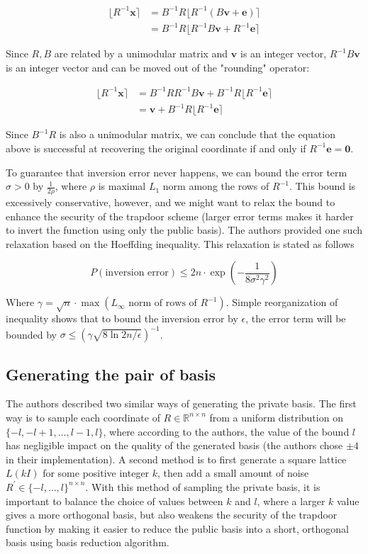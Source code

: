 \documentclass[letterpaper,12pt]{article}
\begin{document}
$$
\begin{aligned}
\lfloor R^{-1}\mathbf{x} \rceil &= B^{-1}R\lfloor R^{-1}(B\mathbf{v} + \mathbf{e})\rceil \\
&= B^{-1}R\lfloor R^{-1}B\mathbf{v} + R^{-1}\mathbf{e}\rceil
\end{aligned}
$$

Since $R, B$ are related by a unimodular matrix and $\mathbf{v}$ is an integer vector, $R^{-1}B\mathbf{v}$ is an integer vector and can be moved out of the "rounding" operator:

$$
\begin{aligned}
\lfloor R^{-1}\mathbf{x} \rceil &= B^{-1}RR^{-1}B\mathbf{v} + B^{-1}R\lfloor R^{-1}\mathbf{e}\rceil \\
&= \mathbf{v} + B^{-1}R\lfloor R^{-1}\mathbf{e} \rceil
\end{aligned}
$$

Since $B^{-1}R$ is also a unimodular matrix, we can conclude that the equation above is successful at recovering the original coordinate if and only if $R^{-1}\mathbf{e} = \mathbf{0}$.

To guarantee that inversion error never happens, we can bound the error term $\sigma > 0$ by $\frac{1}{2\rho}$, where $\rho$ is maximal $L_1$ norm among the rows of $R^{-1}$. This bound is excessively conservative, however, and we might want to relax the bound to enhance the security of the trapdoor scheme (larger error terms makes it harder to invert the function using only the public basis). The authors provided one such relaxation based on the Hoeffding inequality. This relaxation is stated as follows

$$
P(\text{inversion error}) \leq 2n \cdot \exp(-\frac{1}{8\sigma^2\gamma^2})
$$

Where $\gamma = \sqrt{n} \cdot \max(L_\infty \text{ norm of rows of } R^{-1})$. Simple reorganization of inequality shows that to bound the inversion error by $\epsilon$, the error term will be bounded by $\sigma \leq (\gamma\sqrt{8\ln{2n/\epsilon}})^{-1}$.

\subsection{Generating the pair of basis}
The authors described two similar ways of generating the private basis. The first way is to sample each coordinate of $R \in \mathbb{R}^{n \times n}$ from a uniform distribution on $\{-l, -l + 1, \ldots, l-1, l\}$, where according to the authors, the value of the bound $l$ has negligible impact on the quality of the generated basis (the authors chose $\pm 4$ in their implementation). A second method is to first generate a square lattice $L(kI)$ for some positive integer $k$, then add a small amount of noise $R^\prime \in \{-l, \ldots, l\}^{n \times n}$. With this method of sampling the private basis, it is important to balance the choice of values between $k$ and $l$, where a larger $k$ value gives a more orthogonal basis, but also weakens the security of the trapdoor function by making it easier to reduce the public basis into a short, orthogonal basis using basis reduction algorithm.
\end{document}
